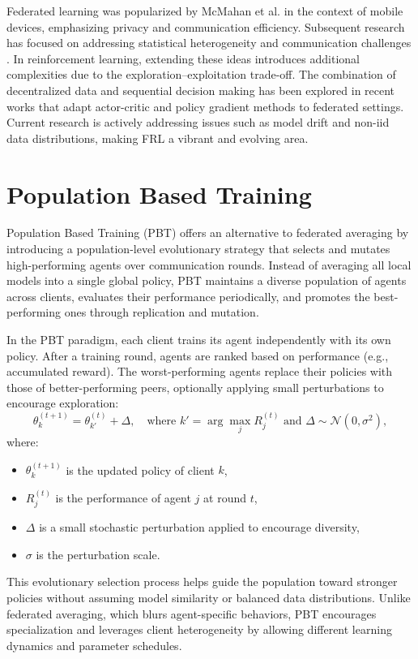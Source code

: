 \documentclass[12pt,a4paper,twoside,openany]{book}
\begin{document}
Federated learning was popularized by McMahan et al. \cite{McMahan2016} in the context of mobile devices, emphasizing privacy and communication efficiency. Subsequent research has focused on addressing statistical heterogeneity and communication challenges \cite{Li2020}. In reinforcement learning, extending these ideas introduces additional complexities due to the exploration–exploitation trade-off. The combination of decentralized data and sequential decision making has been explored in recent works \cite{Zhuo2019} that adapt actor-critic and policy gradient methods to federated settings. Current research is actively addressing issues such as model drift and non-iid data distributions, making FRL a vibrant and evolving area.

\section{Population Based Training}

Population Based Training (PBT) offers an alternative to federated averaging by introducing a population-level evolutionary strategy that selects and mutates high-performing agents over communication rounds. Instead of averaging all local models into a single global policy, PBT maintains a diverse population of agents across clients, evaluates their performance periodically, and promotes the best-performing ones through replication and mutation.

In the PBT paradigm, each client trains its agent independently with its own policy. After a training round, agents are ranked based on performance (e.g., accumulated reward). The worst-performing agents replace their policies with those of better-performing peers, optionally applying small perturbations to encourage exploration:
\[
\theta_k^{(t+1)} = \theta_{k'}^{(t)} + \Delta, \quad \text{where } k' = \arg\max_j R_j^{(t)} \text{ and } \Delta \sim \mathcal{N}(0, \sigma^2),
\]
where:
\begin{itemize}
    \item \(\theta_k^{(t+1)}\) is the updated policy of client \(k\),
    \item \(R_j^{(t)}\) is the performance of agent \(j\) at round \(t\),
    \item \(\Delta\) is a small stochastic perturbation applied to encourage diversity,
    \item \(\sigma\) is the perturbation scale.
\end{itemize}

This evolutionary selection process helps guide the population toward stronger policies without assuming model similarity or balanced data distributions. Unlike federated averaging, which blurs agent-specific behaviors, PBT encourages specialization and leverages client heterogeneity by allowing different learning dynamics and parameter schedules.
\end{document}
